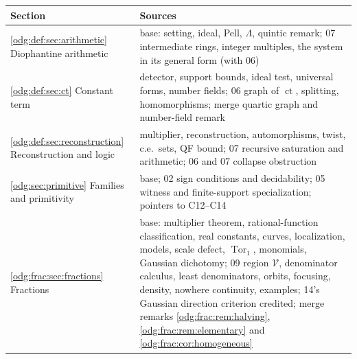 \documentclass[11pt,oneside]{article}
\numberwithin{equation}{section}
\theoremstyle{definition}
\theoremstyle{remark}
\newcommand{\ct}{\operatorname{ct}}
\newcommand{\Tor}{\operatorname{Tor}}
\newcommand{\Vreg}{\mathcal V}
\begin{document}
\begin{center}
\renewcommand{\arraystretch}{1.15}
\begin{tabular}{>{\raggedright\arraybackslash}p{}>{\raggedright\arraybackslash}p{}}
\toprule
Section & Sources\\
\midrule
\ref{odg:def:sec:arithmetic} Diophantine arithmetic & 06 base: setting,
ideal, Pell, $\Lambda$, quintic remark; 07 intermediate rings, integer
multiples, the system in its general form (with 06)\\
\ref{odg:def:sec:ct} Constant term & 07 detector, support bounds, ideal test,
universal forms, number fields; 06 graph of $\ct$, splitting, homomorphisms;
merge quartic graph and number-field remark\\
\ref{odg:def:sec:reconstruction} Reconstruction and logic & 06 multiplier,
reconstruction, automorphisms, twist, c.e.\ sets, QF bound; 07 recursive
saturation and arithmetic; 06 and 07 collapse obstruction\\
\ref{odg:sec:primitive} Families and primitivity & 01 base; 02 sign
conditions and decidability; 05 witness and finite-support specialization;
pointers to C12--C14\\
\ref{odg:frac:sec:fractions} Fractions & 08 base: multiplier theorem,
rational-function classification, real constants, curves, localization,
models, scale defect, $\Tor_1$, monomials, Gaussian dichotomy; 09 region
$\Vreg$, denominator calculus, least denominators, orbits, focusing, density,
nowhere continuity, examples; 14's Gaussian direction criterion credited;
merge remarks \ref{odg:frac:rem:halving}, \ref{odg:frac:rem:elementary} and
\cref{odg:frac:cor:homogeneous}\\
\bottomrule
\end{tabular}
\end{center}
\end{document}
